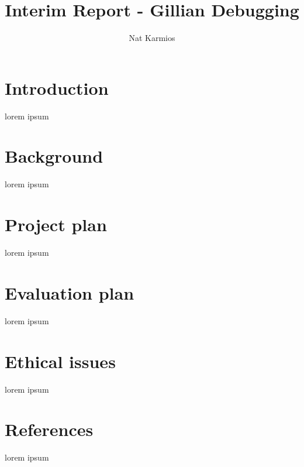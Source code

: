 \documentclass[a4paper, twoside]{report}
\title{Interim Report - Gillian Debugging}
\author{Nat Karmios}
\begin{document}
\tableofcontents

\chapter{Introduction}
lorem ipsum

\chapter{Background}
lorem ipsum

\chapter{Project plan}
lorem ipsum

\chapter{Evaluation plan}
lorem ipsum

\chapter{Ethical issues}
lorem ipsum

\chapter{References}
lorem ipsum
\end{document}
